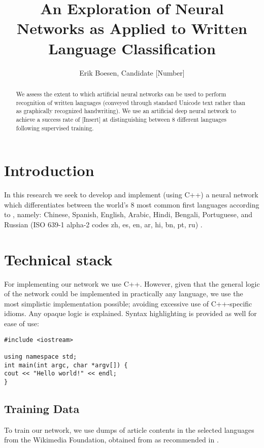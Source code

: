 \documentclass{article}
\begin{document}
\title{An Exploration of Neural Networks as Applied to Written Language Classification}
\author{Erik Boesen, Candidate [Number]}

\maketitle

\begin{abstract}
We assess the extent to which artificial neural networks can be used to perform recognition of written languages (conveyed through standard Unicode text rather than as graphically recognized handwriting). We use an artificial deep neural network to achieve a success rate of [Insert] at distinguishing between 8 different languages following supervised training.
\end{abstract}

\section{Introduction}
In this research we seek to develop and implement (using C++) a neural network which differentiates between the world's 8 most common first languages according to \cite{ethnologue}, namely: Chinese, Spanish, English, Arabic, Hindi, Bengali, Portuguese, and Russian (ISO 639-1 alpha-2 codes zh, es, en, ar, hi, bn, pt, ru) \cite{iso639}.

\section{Technical stack}
For implementing our network we use C++. However, given that the general logic of the network could be implemented in practically any language, we use the most simplistic implementation possible; avoiding excessive use of C++-specific idioms. Any opaque logic is explained. Syntax highlighting is provided as well for ease of use:
\begin{verbatim}
#include <iostream>

using namespace std;
int main(int argc, char *argv[]) {
cout << "Hello world!" << endl;
}
\end{verbatim}

\subsection{Training Data}
To train our network, we use dumps of article contents in the selected languages from the Wikimedia Foundation, obtained from \cite{wikidumps} as recommended in \cite{langsamp}. %
\end{document}
